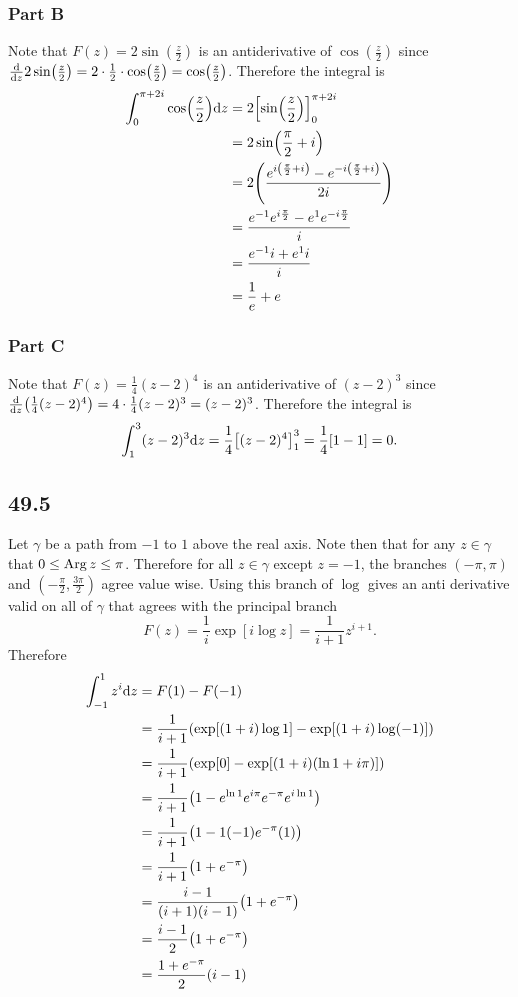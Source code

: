 \documentclass[12pt,titlepage]{extarticle}
\begin{document}
\subsubsection*{Part B}
Note that $F(z) = 2\sin(\frac{z}{2})$ is an antiderivative of $\cos(\frac{z}{2})$ since $\dv{z} 2 \sin(\frac{z}{2}) = 2 \cdot \frac{1}{2} \cdot \cos(\frac{z}{2}) = \cos(\frac{z}{2})$. Therefore the integral is 
\begin{align*}
    \int_0^{\pi + 2i} \cos(\frac{z}{2}) \dd z &= 2\qty[\sin(\frac{z}{2})]_0^{\pi + 2i} \\
    &= 2 \sin(\frac{\pi}{2} + i) \\
    &= 2 \qty(\frac{e^{i\qty(\frac{\pi}{2} + i)} - e^{-i\qty(\frac{\pi}{2} + i)}}{2i}) \\
    &= \frac{e^{-1}e^{i \frac{\pi}{2}} - e^{1} e^{-i \frac{\pi}{2}}}{i} \\
    &= \frac{e^{-1}i + e^{1}i}{i} \\
    &= \frac{1}{e} + e
\end{align*}

\subsubsection*{Part C}
Note that $F(z) = \frac{1}{4}(z-2)^4$ is an antiderivative of $(z-2)^3$ since $\dv{z}(\frac{1}{4}(z-2)^4) = 4 \cdot \frac{1}{4} (z-2)^3 = (z-2)^3$. Therefore the integral is
\[
    \int_1^3 (z-2)^3 \dd z = \frac{1}{4} \qty[(z-2)^4]_1^3 = \frac{1}{4} \qty[1 - 1] = 0
.\]

\subsection*{49.5}
Let $\gamma$ be a path from $-1$ to $1$ above the real axis. Note then that for any $z \in \gamma$ that $0 \leq \operatorname{Arg} z \leq \pi$. Therefore for all $z \in \gamma$ except $z = -1$, the branches $(-\pi, \pi)$ and $(-\frac{\pi}{2}, \frac{3 \pi}{2})$ agree value wise. Using this branch of $\log$ gives an anti derivative valid on all of $\gamma$ that agrees with the principal branch
\[
    F(z) = \frac{1}{i} \exp[i \log z] = \frac{1}{i+1} z^{i+1}
.\]
Therefore
\begin{align*}
    \int_{-1}^{1} z^i \dd z &= F(1) - F(-1)  \\
    &= \frac{1}{i+1} \qty(\exp[(1+i) \log 1] - \exp[(1+i) \log(-1)])  \\
    &= \frac{1}{i+1} \qty(\exp[0] - \exp[(1+i)(\ln 1 + i\pi)])  \\
    &= \frac{1}{i+1} \qty(1 - e^{\ln 1} e^{i \pi} e^{-\pi} e^{i \ln 1}) \\
    &= \frac{1}{i+1} \qty(1 - 1(-1) e^{-\pi}(1)) \\
    &= \frac{1}{i+1} \qty(1 + e^{-\pi}) \\
    &= \frac{i - 1}{(i+1)(i-1)} \qty(1 + e^{-\pi}) \\
    &= \frac{i - 1}{2} \qty(1 + e^{-\pi}) \\
    &= \frac{1 + e^{-\pi}}{2} (i - 1)
\end{align*}
\end{document}
